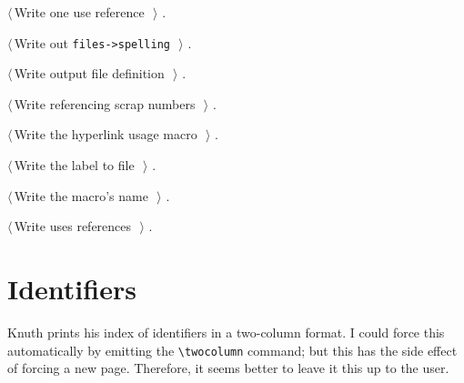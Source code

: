 \documentclass[a4paper]{report}
\begin{document}
{\begin{list}{}{\setlength{\itemsep}{-\parsep}\setlength{\itemindent}{-\leftmargin}}
{}
\item $\langle\,$Write one use reference\nobreak\ {\footnotesize {}}$\,\rangle$ {\footnotesize {\NWtxtRefIn} .}
\item $\langle\,$Write out \verb|files->spelling|\nobreak\ {\footnotesize {}}$\,\rangle$ {\footnotesize {\NWtxtRefIn} .}
\item $\langle\,$Write output file definition\nobreak\ {\footnotesize {}}$\,\rangle$ {\footnotesize {\NWtxtRefIn} .}
\item $\langle\,$Write referencing scrap numbers\nobreak\ {\footnotesize {}}$\,\rangle$ {\footnotesize {\NWtxtRefIn} .}
\item $\langle\,$Write the hyperlink usage macro\nobreak\ {\footnotesize {}}$\,\rangle$ {\footnotesize {\NWtxtRefIn} .}
\item $\langle\,$Write the label to file\nobreak\ {\footnotesize {}}$\,\rangle$ {\footnotesize {\NWtxtRefIn} .}
\item $\langle\,$Write the macro's name\nobreak\ {\footnotesize {}}$\,\rangle$ {\footnotesize {\NWtxtRefIn} .
}
\item $\langle\,$Write uses references\nobreak\ {\footnotesize {}}$\,\rangle$ {\footnotesize {\NWtxtRefIn} .}
\end{list}}

\section{Identifiers}

Knuth prints his index of identifiers in a two-column format.
I could force this automatically by emitting the \verb|\twocolumn|
command; but this has the side effect of forcing a new page.
Therefore, it seems better to leave it this up to the user.
\end{document}
